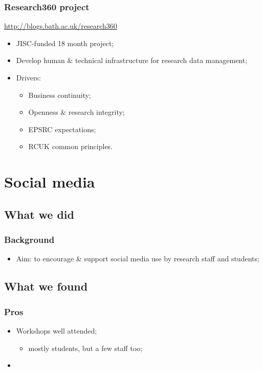 \documentclass{beamer}
\begin{document}
\begin{frame}
  \frametitle{Research360 project}
  
  \begin{center}
    \Large\url{http://blogs.bath.ac.uk/research360}
  \end{center}

  \begin{itemize}
    \item JISC-funded 18 month project;
    \item Develop human \& technical infrastructure for research data management;
    \item Drivers:
      \begin{itemize}
        \item Business continuity;
        \item Openness \& research integrity;
        \item EPSRC expectations;
        \item RCUK common principles.
      \end{itemize}
  \end{itemize}
\end{frame}

\section{Social media}

\subsection{What we did}

\begin{frame}
  \frametitle{Background}
  
  \begin{itemize}
    \item Aim: to encourage \& support social media use by research staff and students;
  \end{itemize}
\end{frame}

\subsection{What we found}

\begin{frame}
  \frametitle{Pros}
  
  \begin{itemize}
    \item Workshops well attended;
      \begin{itemize}
        \item mostly students, but a few staff too;
      \end{itemize}
    \item 
  \end{itemize}
\end{frame}
\end{document}
